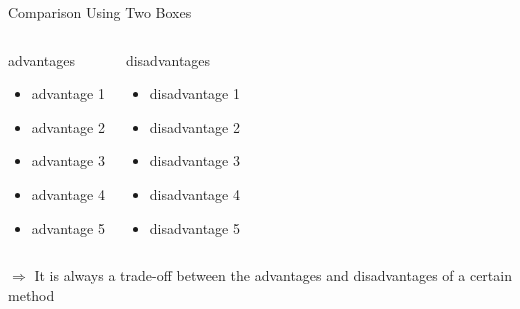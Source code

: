 \documentclass[english,american,german,aspectratio=43]{beamer}
\begin{document}
\begin{frame}{Comparison Using Two Boxes}

  \begin{columns}[t]

    \begin{exampleblock}{advantages \cite{IEEE:15/0609r2}}

      \begin{itemize}
        \item advantage 1
        \item advantage 2
        \item advantage 3
        \item advantage 4
        \item advantage 5
      \end{itemize}
    \end{exampleblock}


    \begin{alertblock}{disadvantages}

      \begin{itemize}
        \item disadvantage 1
        \item disadvantage 2
        \item disadvantage 3
        \item disadvantage 4
        \item disadvantage 5
      \end{itemize}
    \end{alertblock}
  \end{columns}

  \bigskip{}

  $\mathit{\Longrightarrow}$ It is always a trade-off between the advantages
  and disadvantages of a certain method \cite{Jones:2015}
\end{frame}
\end{document}
